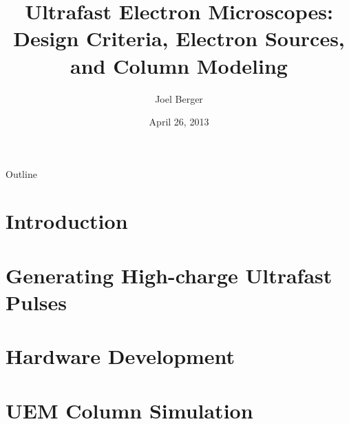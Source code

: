 \documentclass[mathserif]{beamer}
\title[Ultrafast EM]{Ultrafast Electron Microscopes:\\Design Criteria, Electron Sources, and Column Modeling}
\author{Joel Berger}
\institute[UIC]{Ph.D. Preliminary Examination}
\date{April 26, 2013}
\begin{document}
\begin{frame}
  \maketitle
\end{frame}

\begin{frame}{Outline}
  \tableofcontents
\end{frame}



\section{Introduction}




\section{Generating High-charge Ultrafast Pulses}


\section{Hardware Development}


\section{UEM Column Simulation}

\end{document}
